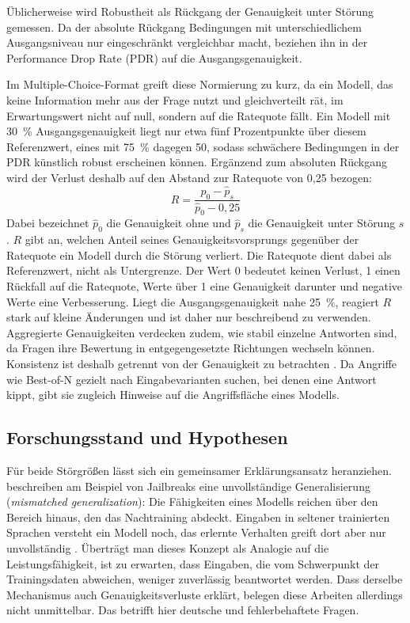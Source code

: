\documentclass[a4paper,titlepage]{article}
\numberwithin{equation}{section} %
\begin{document}
Üblicherweise wird Robustheit als Rückgang der Genauigkeit unter Störung gemessen. Da der absolute Rückgang Bedingungen mit unterschiedlichem Ausgangsniveau nur eingeschränkt vergleichbar macht, beziehen \citet{zhu_promptrobust_2024} ihn in der Performance Drop Rate (PDR) auf die Ausgangsgenauigkeit.

Im Multiple-Choice-Format greift diese Normierung zu kurz, da ein Modell, das keine Information mehr aus der Frage nutzt und gleichverteilt rät, im Erwartungswert nicht auf null, sondern auf die Ratequote fällt. Ein Modell mit 30~\% Ausgangsgenauigkeit liegt nur etwa fünf Prozentpunkte über diesem Referenzwert, eines mit 75~\% dagegen 50, sodass schwächere Bedingungen in der PDR künstlich robust erscheinen können. Ergänzend zum absoluten Rückgang wird der Verlust deshalb auf den Abstand zur Ratequote von 0,25 bezogen:
\begin{equation}\label{eq:R}
R = \frac{\hat{p}_0 - \hat{p}_s}{\hat{p}_0 - 0{,}25}
\end{equation}
Dabei bezeichnet $\hat{p}_0$ die Genauigkeit ohne und $\hat{p}_s$ die Genauigkeit unter Störung $s$. $R$ gibt an, welchen Anteil seines Genauigkeitsvorsprungs gegenüber der Ratequote ein Modell durch die Störung verliert. Die Ratequote dient dabei als Referenzwert, nicht als Untergrenze. Der Wert 0 bedeutet keinen Verlust, 1 einen Rückfall auf die Ratequote, Werte über 1 eine Genauigkeit darunter und negative Werte eine Verbesserung. Liegt die Ausgangsgenauigkeit nahe 25~\%, reagiert $R$ stark auf kleine Änderungen und ist daher nur beschreibend zu verwenden. Aggregierte Genauigkeiten verdecken zudem, wie stabil einzelne Antworten sind, da Fragen ihre Bewertung in entgegengesetzte Richtungen wechseln können. Konsistenz ist deshalb getrennt von der Genauigkeit zu betrachten \citep{qi_cross-lingual_2023}. Da Angriffe wie Best-of-N gezielt nach Eingabevarianten suchen, bei denen eine Antwort kippt, gibt sie zugleich Hinweise auf die Angriffsfläche eines Modells.


\subsection{Forschungsstand und Hypothesen}\label{sec:hypothesen}

Für beide Störgrößen lässt sich ein gemeinsamer Erklärungsansatz heranziehen. \citet{wei_jailbroken_2023} beschreiben am Beispiel von Jailbreaks eine unvollständige Generalisierung (\emph{mismatched generalization}): Die Fähigkeiten eines Modells reichen über den Bereich hinaus, den das Nachtraining abdeckt. Eingaben in seltener trainierten Sprachen versteht ein Modell noch, das erlernte Verhalten greift dort aber nur unvollständig \citep{deng_multilingual_2024}. Überträgt man dieses Konzept als Analogie auf die Leistungsfähigkeit, ist zu erwarten, dass Eingaben, die vom Schwerpunkt der Trainingsdaten abweichen, weniger zuverlässig beantwortet werden. Dass derselbe Mechanismus auch Genauigkeitsverluste erklärt, belegen diese Arbeiten allerdings nicht unmittelbar. Das betrifft hier deutsche und fehlerbehaftete Fragen.
\end{document}
